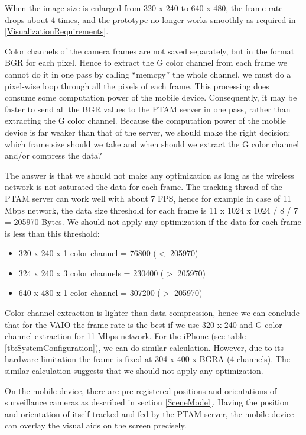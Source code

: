 When the image size is enlarged from 320 x 240 to 640 x 480, the frame rate drops about 4 times, and the prototype no longer works smoothly as required in \ref{VisualizationRequirements}.

Color channels of the camera frames are not saved separately, but in the format BGR for each pixel. Hence to extract the G color channel from each frame we cannot do it in one pass by calling ``memcpy'' the whole channel, we must do a pixel-wise loop through all the pixels of each frame. This processing does consume some computation power of the mobile device. Consequently, it may be faster to send all the BGR values to the PTAM server in one pass, rather than extracting the G color channel. Because the computation power of the mobile device is far weaker than that of the server, we should make the right decision: which frame size should we take and when should we extract the G color channel and/or compress the data?

The answer is that we should not make any optimization as long as the wireless network is not saturated the data for each frame. The tracking thread of the PTAM server can work well with about 7 FPS, hence for example in case of 11 Mbps network, the data size threshold for each frame is 11 x 1024 x 1024 / 8 / 7 = 205970 Bytes. We should not apply any optimization if the data for each frame is less than this threshold:

\begin{itemize}
	\item 320 x 240 x 1 color channel = 76800 ($<$ 205970)
	\item 324 x 240 x 3 color channels = 230400 ($>$ 205970)
	\item 640 x 480 x 1 color channel = 307200 ($>$ 205970)
\end{itemize}

Color channel extraction is lighter than data compression, hence we can conclude that for the VAIO the frame rate is the best if we use 320 x 240 and G color channel extraction for 11 Mbps network. For the iPhone (see table \ref{tb:SystemConfiguration}), we can do similar calculation. However, due to its hardware limitation the frame is fixed at 304 x 400 x BGRA (4 channels). The similar calculation suggests that we should not apply any optimization.

On the mobile device, there are pre-registered positions and orientations of surveillance cameras as described in section \ref{SceneModel}. Having the position and orientation of itself tracked and fed by the PTAM server, the mobile device can overlay the visual aids on the screen precisely.

